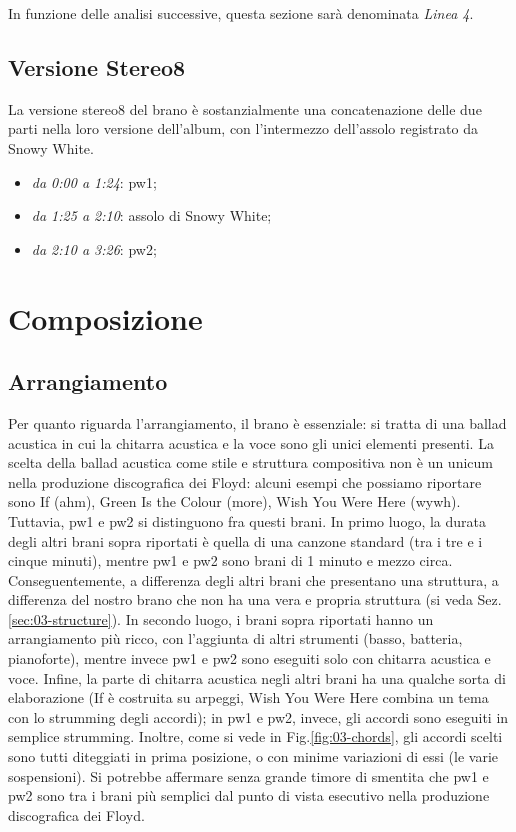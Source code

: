 \documentclass[class=book, crop=false, oneside, 12pt]{standalone}
\begin{document}
    In funzione delle analisi successive, questa sezione sarà denominata \emph{Linea 4}.

    \subsection{Versione Stereo8}
    La versione stereo8 del brano è sostanzialmente una concatenazione delle due parti nella loro versione dell'album, con l'intermezzo dell'assolo registrato da Snowy White. 

    \begin{itemize}
        \item \emph{da 0:00 a 1:24}: \acrlong{pw1};
        \item \emph{da 1:25 a 2:10}: assolo di Snowy White;
        \item \emph{da 2:10 a 3:26}: \acrlong{pw2};
    \end{itemize}

    \section{Composizione}
    \label{sec:03-arrangement}

    \subsection{Arrangiamento}
    Per quanto riguarda l'arrangiamento, il brano è essenziale: si tratta di una ballad acustica in cui la chitarra acustica e la voce sono gli unici elementi presenti. La scelta della ballad acustica come stile e struttura compositiva non è un unicum nella produzione discografica dei Floyd: alcuni esempi che possiamo riportare sono If (\acrshort{ahm}), Green Is the Colour (\acrshort{more}), Wish You Were Here (\acrshort{wywh}). Tuttavia, \acrshort{pw1} e \acrshort{pw2} si distinguono fra questi brani. In primo luogo, la durata degli altri brani sopra riportati è quella di una canzone standard (tra i tre e i cinque minuti), mentre \acrshort{pw1} e \acrshort{pw2} sono brani di 1 minuto e mezzo circa. Conseguentemente, a differenza  degli altri brani che presentano una struttura, a differenza del nostro brano che non ha una vera e propria struttura (si veda Sez.\ref{sec:03-structure}). In secondo luogo, i brani sopra riportati hanno un arrangiamento più ricco, con l'aggiunta di altri strumenti (basso, batteria, pianoforte), mentre invece \acrshort{pw1} e \acrshort{pw2} sono eseguiti solo con chitarra acustica e voce. Infine, la parte di chitarra acustica negli altri brani ha una qualche sorta di elaborazione (If è costruita su arpeggi, Wish You Were Here combina un tema con lo strumming degli accordi); in \acrshort{pw1} e \acrshort{pw2}, invece, gli accordi sono eseguiti in semplice strumming. Inoltre, come si vede in Fig.\ref{fig:03-chords}, gli accordi scelti sono tutti diteggiati in prima posizione, o con minime variazioni di essi (le varie sospensioni). Si potrebbe affermare senza grande timore di smentita che \acrshort{pw1} e \acrshort{pw2} sono tra i brani più semplici dal punto di vista esecutivo nella produzione discografica dei Floyd.
    
\end{document}
